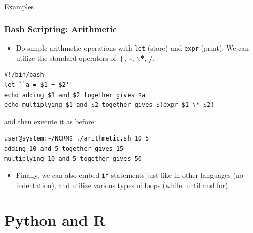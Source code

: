 \documentclass[10pt]{beamer}
\begin{document}
\subsection{}
\begin{frame}[fragile]{Examples}
\frametitle{Bash Scripting: Arithmetic}
\begin{itemize}
\item Do simple arithmetic operations with \texttt{let} (store) and \texttt{expr} (print). We can utilize the standard operators of \textbf{+}, \textbf{-}, \textbf{$\backslash$*},\textbf{ /}.
\end{itemize}
\begin{lstlisting}[style=BashInputStyle,title=Simple Arithmetic Operations: \texttt{myfourthscript.sh}]
#!/bin/bash
let ``a = $1 + $2''
echo adding $1 and $2 together gives $a
echo multiplying $1 and $2 together gives $(expr $1 \* $2)
\end{lstlisting}\vspace{0.05in}
\quad and then execute it as before:
\begin{lstlisting}[style=BashInputStyle,title=Executing \texttt{myfourthscript.sh}]
user@system:~/NCRM$ ./arithmetic.sh 10 5
adding 10 and 5 together gives 15
multiplying 10 and 5 together gives 50
\end{lstlisting}\vspace{0.05in}
\begin{itemize}
\item Finally, we can also embed \texttt{if} statements just like in other languages (no indentation), and utilize various types of loops (while, until and for).\vspace{0.05in}
\end{itemize}
\end{frame}

\section{Python and R}
\end{document}
